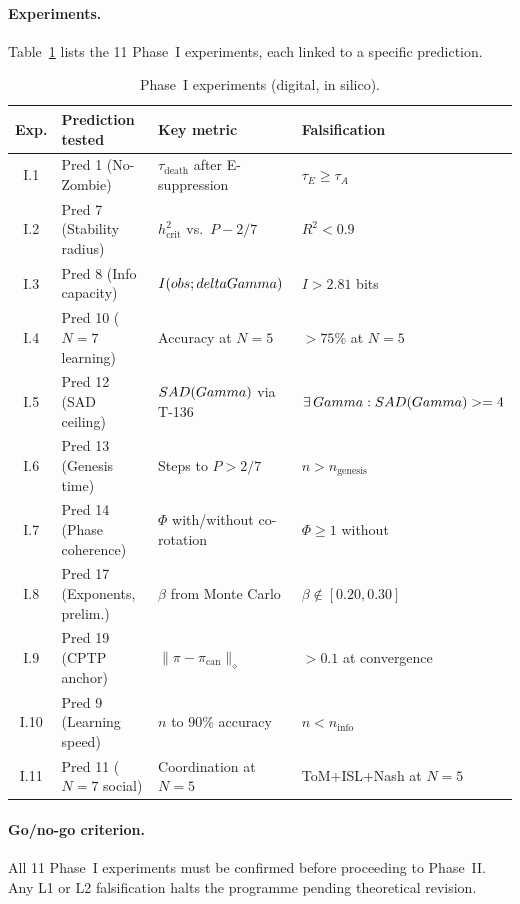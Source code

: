 \paragraph{Experiments.}
Table~\ref{tab:phase1} lists the 11 Phase~I experiments, each linked to a specific
prediction.

\begin{table}[H]
\centering
\caption{Phase~I experiments (digital, in silico).}
\label{tab:phase1}
\small
\begin{tabular}{@{}clll@{}}
\toprule
\textbf{Exp.} & \textbf{Prediction tested} & \textbf{Key metric} & \textbf{Falsification} \\
\midrule
I.1 & Pred 1 (No-Zombie) & $\tau_{\mathrm{death}}$ after E-suppression & $\tau_E \geq \tau_A$ \\
I.2 & Pred 7 (Stability radius) & $h_{\mathrm{crit}}^2$ vs.\ $P - 2/7$ & $R^2 < 0.9$ \\
I.3 & Pred 8 (Info capacity) & $I(obs;deltaGamma)$ & $I > 2.81$ bits \\
I.4 & Pred 10 ($N=7$ learning) & Accuracy at $N=5$ & $> 75\%$ at $N=5$ \\
I.5 & Pred 12 (SAD ceiling) & $SAD(Gamma)$ via T-136 & $\exists\,Gamma:SAD(Gamma)>= 4$ \\
I.6 & Pred 13 (Genesis time) & Steps to $P > 2/7$ & $n > n_{\mathrm{genesis}}$ \\
I.7 & Pred 14 (Phase coherence) & $\Phi$ with/without co-rotation & $\Phi \geq 1$ without \\
I.8 & Pred 17 (Exponents, prelim.) & $\beta$ from Monte Carlo & $\beta \notin [0.20, 0.30]$ \\
I.9 & Pred 19 (CPTP anchor) & $\|\pi - \pi_{\mathrm{can}}\|_\diamond$ & $> 0.1$ at convergence \\
I.10 & Pred 9 (Learning speed) & $n$ to 90\% accuracy & $n < n_{\mathrm{info}}$ \\
I.11 & Pred 11 ($N=7$ social) & Coordination at $N=5$ & ToM+ISL+Nash at $N=5$ \\
\bottomrule
\end{tabular}
\end{table}

\paragraph{Go/no-go criterion.}
All 11 Phase~I experiments must be confirmed before proceeding to Phase~II. Any L1 or L2
falsification halts the programme pending theoretical revision.

